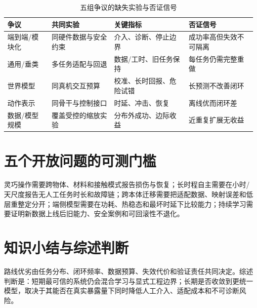 \begin{table}[H]
\begingroup{}
\centering\small
\caption{五组争议的缺失实验与否证信号}
\label{tab:debates-falsification}
\begin{tabularx}{\textwidth}{p{}YYp{0.27\textwidth}}
\toprule
争议 & 共同实验 & 关键指标 & 否证信号 \\
\midrule
端到端/模块化 & 同硬件数据与安全约束 & 介入、诊断、停止边界 & 成功率高但失效不可隔离 \\
通用/垂类 & 多任务适配与回退 & 数据/工时、旧任务保持 & 每任务仍需完整重做 \\
世界模型 & 同真机交互预算 & 校准、长时回报、危险试错 & 长预测不改善闭环 \\
动作表示 & 同骨干与控制接口 & 时延、冲击、恢复 & 离线优而闭环差 \\
数据/模型规模 & 覆盖受控的缩放实验 & 分布外成功、边际收益 & 近重复扩展无收益 \\
\bottomrule
\end{tabularx}
\endgroup
\end{table}

\section{五个开放问题的可测门槛}

灵巧操作需要跨物体、材料和接触模式报告损伤与恢复；长时程自主需要在小时/天尺度报告无人工任务时长和故障链；跨本体迁移需要把适配数据、映射误差和低层重整定分开；端侧模型需要在功耗、热稳态和最坏时延下比较能力；持续学习需要证明新数据上线后旧能力、安全案例和可回滚性不退化。

\section{知识小结与综述判断}

路线优劣由任务分布、闭环频率、数据预算、失效代价和验证责任共同决定。综述判断是：短期最可信的系统仍会混合学习与显式工程边界；长期是否收敛到更统一模型，取决于其能否在真实暴露量下同时降低人工介入、适配成本和不可诊断风险。
